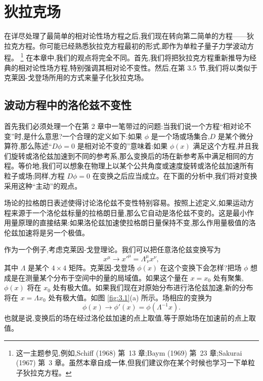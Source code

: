 \chapter{狄拉克场}

在详尽处理了最简单的相对论性场方程之后,我们现在转向第二简单的方程——狄拉克方程。你可能已经熟悉狄拉克方程最初的形式,即作为单粒子量子力学波动方程。%
\footnote{这一主题参见,例如,Schiff (1968) 第~13 章;Baym (1969) 第~23 章;Sakurai (1967) 第~3 章。虽然本章自成一体,但我们建议你在某个时候也学习一下单粒子狄拉克方程。} 在本章中,我们的观点将完全不同。首先,我们将把狄拉克方程重新推导为经典的相对论性场方程,特别强调其相对论不变性。然后,在第 3.5 节,我们将以类似于克莱因-戈登场所用的方式来量子化狄拉克场。

\section{波动方程中的洛伦兹不变性}

首先我们必须处理一个在第 2 章中一笔带过的问题:当我们说一个方程``相对论不变''时,是什么意思?一个合理的定义如下:如果 $\phi$ 是一个场或场集合,$D$ 是某个微分算符,那么陈述``$D\phi = 0$ 是相对论不变的''意味着:如果 $\phi(x)$ 满足这个方程,并且我们旋转或洛伦兹加速到不同的参考系,那么变换后的场在新参考系中满足相同的方程。等价地,我们可以想象在物理上以某个公共角度或速度旋转或洛伦兹加速所有粒子或场;同样,方程 $D\phi = 0$ 在变换之后应当成立。在下面的分析中,我们将对变换采用这种``主动''的观点。

场论的拉格朗日表述使得讨论洛伦兹不变性特别容易。按照上述定义,如果运动方程来源于一个洛伦兹标量的拉格朗日量,那么它自动是洛伦兹不变的。这是最小作用量原理的直接结果:如果洛伦兹加速使拉格朗日量保持不变,那么作用量极值的洛伦兹加速将是另一个极值。

作为一个例子,考虑克莱因-戈登理论。我们可以把任意洛伦兹变换写为
\begin{equation}
  x^\mu \to x'^{\mu} = \Lambda^\mu_{\ \nu} x^\nu,
  \label{eq:3.1}
\end{equation}
其中 $\Lambda$ 是某个 $4\times4$ 矩阵。克莱因-戈登场 $\phi(x)$ 在这个变换下会怎样?把场 $\phi$ 想成是在测量某个分布于空间中的量的局域值。如果这个量在 $x=x_0$ 处有聚集,$\phi(x)$ 将在 $x_0$ 处有极大值。如果我们现在对原始分布进行洛伦兹加速,新的分布将在 $x=\Lambda x_0$ 处有极大值。如图 \ref{fig:3.1}(a) 所示。场相应的变换为
\begin{equation}
  \phi(x) \to \phi'(x) = \phi(\Lambda^{-1}x).
  \label{eq:3.2}
\end{equation}
也就是说,变换后的场在经过洛伦兹加速的点上取值,等于原始场在加速前的点上取值。

